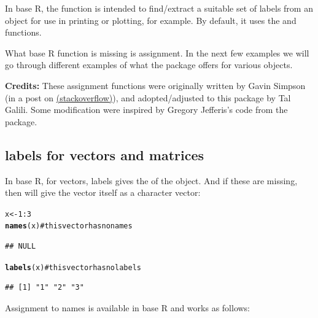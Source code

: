 \documentclass[shortnames,nojss,article]{jss}\usepackage{graphicx, color}
\makeatletter
\newcommand{\hlfunctioncall}[1]{\textcolor[rgb]{0.501960784313725,0,0.329411764705882}{\textbf{#1}}}%
\newcommand{\hlcomment}[1]{\textcolor[rgb]{0.180392156862745,0.6,0.341176470588235}{#1}}%
\newenvironment{kframe}{%
 \def\at@end@of@kframe{}%
 \ifinner\ifhmode%
  \def\at@end@of@kframe{\end{minipage}}%
  \begin{minipage}{\columnwidth}%
 \fi\fi%
 \def\FrameCommand##1{\hskip\@totalleftmargin \hskip-\fboxsep
 \colorbox{shadecolor}{##1}\hskip-\fboxsep
     \hskip-\linewidth \hskip-\@totalleftmargin \hskip\columnwidth}%
 \MakeFramed {\advance\hsize-\width
   \@totalleftmargin\z@ \linewidth\hsize
   \@setminipage}}%
 {\par\unskip\endMakeFramed%
 \at@end@of@kframe}
\newenvironment{knitrout}{}{} %
\makeatother
\begin{document}
In base R, the  function is intended to find/extract a suitable set of labels from an object for use in printing or plotting, for example. By default, it uses the  and  functions.

What base R  function is missing is assignment. In the next few examples we will go through different examples of what the  package offers for various objects.

\textbf{Credits:} These assignment functions were originally written by Gavin Simpson (in a post on \href{http://stackoverflow.com/questions/4614223/how-to-have-the-following-work-labelsx-some-value-r-question}{(stackoverflow)}), and adopted/adjusted to this package by Tal Galili. Some modification were inspired by Gregory Jefferis's code from the  package.


\subsection{labels for vectors and matrices}

In base R, for vectors, labels gives the  of the object. And if these are missing, then  will give the vector itself as a character vector:

\begin{knitrout}
\color{fgcolor}\begin{kframe}
\begin{alltt}
x <- 1:3
\hlfunctioncall{names}(x)  \hlcomment{# this vector has no names}
\end{alltt}
\begin{verbatim}
## NULL
\end{verbatim}
\begin{alltt}
\hlfunctioncall{labels}(x)  \hlcomment{# this vector has no labels}
\end{alltt}
\begin{verbatim}
## [1] "1" "2" "3"
\end{verbatim}
\end{kframe}
\end{knitrout}


Assignment to names is available in base R and works as follows:
\end{document}
